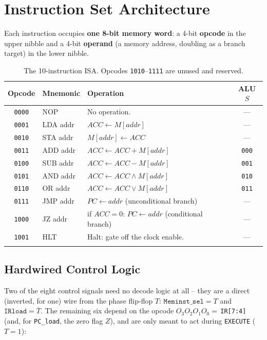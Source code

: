 \documentclass[11pt,a4paper]{article}
\begin{document}
\section{Instruction Set Architecture}
\label{sec:isa}

Each instruction occupies \textbf{one 8-bit memory word}: a 4-bit
\textbf{opcode} in the upper nibble and a 4-bit \textbf{operand} (a
memory address, doubling as a branch target) in the lower nibble.

\begin{longtable}{@{}clp{6.4cm}c@{}}
\toprule
\textbf{Opcode} & \textbf{Mnemonic} & \textbf{Operation} & \textbf{ALU $S$} \\
\midrule
\texttt{0000} & NOP        & No operation.                                            & --- \\
\texttt{0001} & LDA addr   & $ACC \leftarrow M[addr]$                                & --- \\
\texttt{0010} & STA addr   & $M[addr] \leftarrow ACC$                                & --- \\
\texttt{0011} & ADD addr   & $ACC \leftarrow ACC + M[addr]$                          & \texttt{000} \\
\texttt{0100} & SUB addr   & $ACC \leftarrow ACC - M[addr]$                          & \texttt{001} \\
\texttt{0101} & AND addr   & $ACC \leftarrow ACC \wedge M[addr]$                     & \texttt{010} \\
\texttt{0110} & OR addr    & $ACC \leftarrow ACC \vee M[addr]$                       & \texttt{011} \\
\texttt{0111} & JMP addr   & $PC \leftarrow addr$ (unconditional branch)             & --- \\
\texttt{1000} & JZ addr    & if $ACC = 0$: $PC \leftarrow addr$ (conditional branch) & --- \\
\texttt{1001} & HLT        & Halt: gate off the clock enable.                        & --- \\
\bottomrule
\caption{The 10-instruction ISA. Opcodes \texttt{1010}--\texttt{1111} are
unused and reserved.}
\end{longtable}

\subsection*{Hardwired Control Logic}

Two of the eight control signals need no decode logic at all -- they are
a direct (inverted, for one) wire from the phase flip-flop $T$:
$\mathtt{Meminst\_sel} = T$ and $\mathtt{IRload} = \overline{T}$. The
remaining six depend on the opcode $O_3O_2O_1O_0=$\,\texttt{IR[7:4]}
(and, for \texttt{PC\_load}, the zero flag $Z$), and are only meant to
act during \texttt{EXECUTE} ($T{=}1$):
\end{document}
